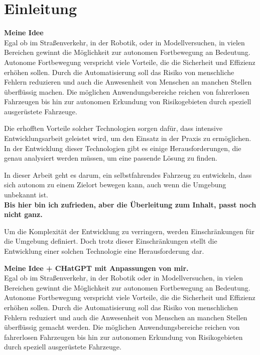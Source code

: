 \section{Einleitung}

\textbf{Meine Idee}\\

Egal ob im Straßenverkehr, in der Robotik, oder in Modellversuchen, in vielen Bereichen gewinnt die Möglichkeit zur autonomen Fortbewegung an Bedeutung.
Autonome Fortbewegung verspricht viele Vorteile, die die Sicherheit und Effizienz erhöhen sollen.
Durch die Automatisierung soll das Risiko von menschliche Fehlern reduzieren und auch die Anwesenheit von Menschen an manchen Stellen überflüssig machen.
Die möglichen Anwendungsbereiche reichen von fahrerlosen Fahrzeugen bis hin zur autonomen Erkundung von Risikogebieten durch speziell ausgerüstete Fahrzeuge.

Die erhofften Vorteile solcher Technologien sorgen dafür, dass intensive Entwicklungsarbeit geleistet wird, um den Einsatz in der Praxis zu ermöglichen.
In der Entwicklung dieser Technologien gibt es einige Herausforderungen, die genau analysiert werden müssen, um eine passende Lösung zu finden.

In dieser Arbeit geht es darum, ein selbstfahrendes Fahrzeug zu entwickeln, dass sich autonom zu einem Zielort bewegen kann, auch wenn die Umgebung unbekannt ist.\\
\textbf{Bis hier bin ich zufrieden, aber die Überleitung zum Inhalt, passt noch nicht ganz.}

Um die Komplexität der Entwicklung zu verringern, werden Einschränkungen für die Umgebung definiert. 
Doch trotz dieser Einschränkungen stellt die Entwicklung einer solchen Technologie eine Herausforderung dar.


\textbf{Meine Idee + CHatGPT mit Anpassungen von mir.}\\
Egal ob im Straßenverkehr, in der Robotik oder in Modellversuchen, in vielen Bereichen gewinnt die Möglichkeit zur autonomen Fortbewegung an Bedeutung. 
Autonome Fortbewegung verspricht viele Vorteile, die die Sicherheit und Effizienz erhöhen sollen. 
Durch die Automatisierung soll das Risiko von menschlichen Fehlern reduziert und auch die Anwesenheit von Menschen an manchen Stellen überflüssig gemacht werden. 
Die möglichen Anwendungsbereiche reichen von fahrerlosen Fahrzeugen bis hin zur autonomen Erkundung von Risikogebieten durch speziell ausgerüstete Fahrzeuge.

